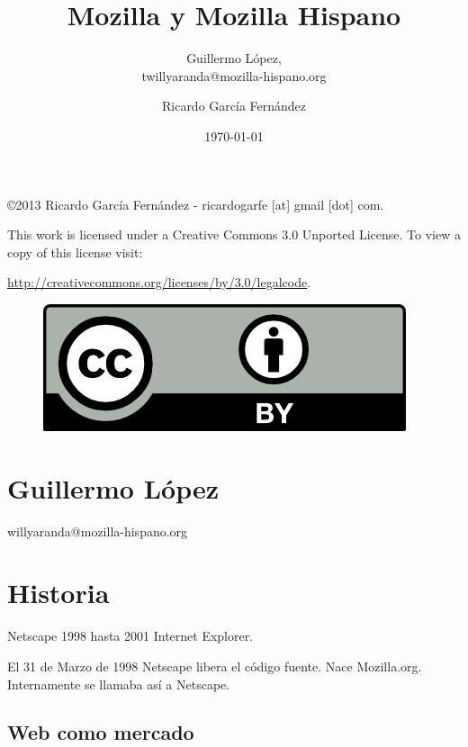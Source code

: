 \documentclass[11pt]{scrartcl}
\title{\textbf{Mozilla y Mozilla Hispano}}
\subtitle{Guillermo L\'opez,\\twillyaranda@mozilla-hispano.org}
\author{Ricardo Garc\'ia Fern\'andez}
\date{\today}
\begin{document}
\maketitle

\vfill

\begin{flushright}
    \copyright  2013 Ricardo Garc\'ia Fern\'andez - ricardogarfe [at] gmail [dot] com.

    This work is licensed under a Creative Commons 3.0 Unported License.
    To view a copy of this license visit:
 
    \url{http://creativecommons.org/licenses/by/3.0/legalcode}.
\end{flushright}

\begin{figure}[h]
    \begin{flushright}	
        \includegraphics{by}
        \label{fig:by}
    \end{flushright}
\end{figure}

\newpage

\section{Guillermo L\'opez}

{\tiny willyaranda@mozilla-hispano.org}

\section{Historia}
\label{sec:historia}

Netscape 1998 hasta 2001 Internet Explorer.

El 31 de Marzo de 1998 Netscape libera el c\'odigo fuente. Nace Mozilla.org. Internamente se llamaba as\'i a Netscape.


\subsection{Web como mercado}
\label{sub:web-mercado}
\end{document}
